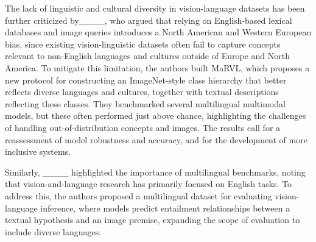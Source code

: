 The lack of linguistic and cultural diversity in vision-language datasets has been further criticized by____, who argued that relying on English-based lexical databases and image queries introduces a North American and Western European bias, since existing vision-linguistic datasets often fail to capture concepts relevant to non-English languages and cultures outside of Europe and North America. To mitigate this limitation, the authors built MaRVL, which proposes a new protocol for constructing an ImageNet-style class hierarchy that better reflects diverse languages and cultures, together with textual descriptions reflecting these classes. They benchmarked several multilingual multimodal models, but these often performed just above chance, highlighting the challenges of handling out-of-distribution concepts and images. The results call for a reassessment of model robustness and accuracy, and for the development of more inclusive systems.

Similarly, ____ highlighted the importance of multilingual benchmarks, noting that vision-and-language research has primarily focused on English tasks. To address this, the authors proposed a multilingual dataset for evaluating vision-language inference, where models predict entailment relationships between a textual hypothesis and an image premise, expanding the scope of evaluation to include diverse languages.